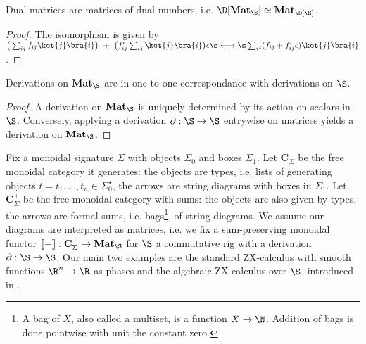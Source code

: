 \begin{proposition}
Dual matrices are matrices of dual numbers, i.e.
$\D[\mathbf{Mat}_\S] \simeq \mathbf{Mat}_{\D[\S]}$.
\end{proposition}

\begin{proof}
The isomorphism is given by
$\big( \sum_{ij} f_{ij} \ket{j} \bra{i} \big)
\ + \ \big( f'_{ij} \sum_{ij} \ket{j}  \bra{i} \big) \epsilon
\s \longleftrightarrow \s
\sum_{ij} (f_{ij} + f'_{ij} \epsilon) \ket{j} \bra{i}$.
\end{proof}

\begin{proposition}
Derivations on $\mathbf{Mat}_\S$ are in one-to-one correspondance with
derivations on $\S$.
\end{proposition}

\begin{proof}
A derivation on $\mathbf{Mat}_\S$ is uniquely determined by its action on
scalars in $\S$. Conversely, applying a derivation $\partial : \S \to \S$
entrywise on matrices yields a derivation on $\mathbf{Mat}_\S$.
\end{proof}

Fix a monoidal signature $\Sigma$ with objects $\Sigma_0$ and boxes $\Sigma_1$.
Let $\mathbf{C}_\Sigma$ be the free monoidal category it generates:
the objects are types, i.e. lists of generating objects
$t = t_1, \dots, t_n \in \Sigma_0^\star$, the arrows are
string diagrams with boxes in $\Sigma_1$.
Let $\mathbf{C}_\Sigma^+$ be the free monoidal category with sums:
the objects are also given by types, the arrows are formal sums, i.e.
bags\footnote{A bag of $X$, also called a multiset, is a function $X \to \N$.
Addition of bags is done pointwise with unit the constant zero.},
of string diagrams.
We assume our diagrams are interpreted as matrices, i.e. we fix a sum-preserving
monoidal functor $[\![-]\!]  : \mathbf{C}_\Sigma^+ \to \mathbf{Mat}_\S$
for $\S$ a commutative rig with a derivation $\partial : \S \to \S$.
Our main two examples are the standard ZX-calculus with smooth functions
$\R^n \to \R$ as phases and the algebraic ZX-calculus over $\S$,
introduced in \cite{Wang20}.

